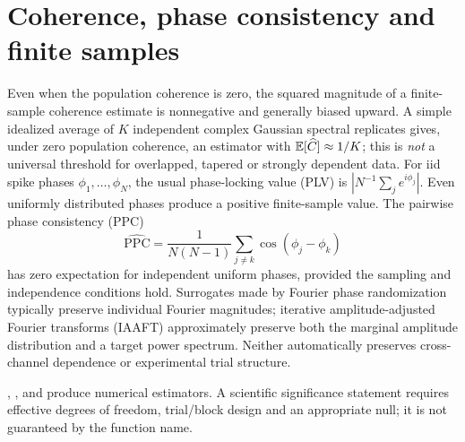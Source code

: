 \section{Coherence, phase consistency and finite samples}
Even when the population coherence is zero, the squared
magnitude of a finite-sample coherence estimate is nonnegative
and generally biased upward. A simple idealized average of
$K$ independent complex Gaussian spectral replicates gives,
under zero population coherence, an estimator with
$\mathbb{E}[\widehat C]\approx1/K$; this is \emph{not} a universal
threshold for overlapped, tapered or strongly dependent data.
For iid spike phases $\phi_1,\ldots,\phi_N$, the usual
phase-locking value (PLV) is $|N^{-1}\sum_j e^{i\phi_j}|$.
Even uniformly distributed phases produce a positive finite-sample
value. The pairwise phase consistency (PPC)
\[
\widehat{\mathrm{PPC}}=
\frac{1}{N(N-1)}\sum_{j\ne k}
\cos(\phi_j-\phi_k)
\]
has zero expectation for independent uniform phases,
provided the sampling and independence conditions hold.
Surrogates made by Fourier phase randomization typically preserve
individual Fourier magnitudes; iterative amplitude-adjusted Fourier
transforms (IAAFT) approximately preserve both the marginal amplitude
distribution and a target power spectrum. Neither automatically
preserves cross-channel dependence or experimental trial structure.

\begin{example}\sloppy
{},
,
 and
produce numerical estimators. A scientific significance statement
requires effective degrees of freedom, trial/block design and
an appropriate null; it is not guaranteed by the function name.
\end{example}
